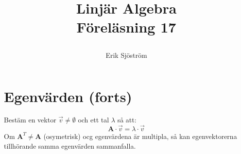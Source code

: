 

\title{
	 Linjär Algebra\\
	 Föreläsning 17 
    \author{Erik Sjöström}
}

\maketitle

\section{Egenvärden (forts)} %
\label{sec:egenv_rden}
Bestäm en vektor $\vec{v} \neq \emptyset$ och ett tal $\lambda$ så att:
\[
\mathbf{A} \cdot \vec{v} = \lambda \cdot \vec{v}
\]
Om $\mathbf{A}^{T} \neq \mathbf{A}$ (osymetrisk) ocg egenvärdena är multipla, så kan egenvektorerna tillhörande samma egenvärden sammanfalla.
